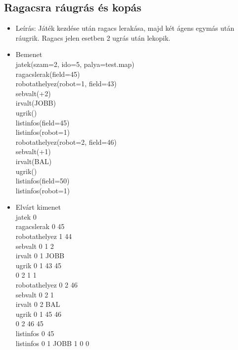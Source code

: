 \subsection{Ragacsra ráugrás és kopás}
\begin{itemize}
	\item Leírás: Játék kezdése után ragacs lerakása, majd két ágens egymás után ráugrik. Ragacs jelen esetben 2 ugrás után lekopik.
	\item Bemenet\\
		jatek(szam=2, ido=5, palya=test.map) \\
		ragacslerak(field=45) \\
		robotathelyez(robot=1, field=43) \\
		sebvalt(+2) \\
		irvalt(JOBB) \\
		ugrik() \\
		listinfos(field=45) \\
		listinfos(robot=1) \\
		robotathelyez(robot=2, field=46) \\
		sebvalt(+1) \\
		irvalt(BAL) \\
		ugrik() \\
		listinfos(field=50) \\		
		listinfos(robot=1) \\		
	\item Elvárt kimenet\\
		jatek 0 \\
		ragacslerak 0 45 \\
		robotathelyez 1 44 \\
		sebvalt 0 1 2 \\ 
		irvalt 0 1 JOBB \\  
		ugrik 0 1 43 45 \\ 
			  0 2 1 1 \\ 		
		robotathelyez 0 2 46 \\
		sebvalt 0 2 1 \\ 
		irvalt 0 2 BAL \\  
		ugrik 0 1 45 46 \\ 
		      0 2 46 45 \\ 		
		listinfos 0 45 \\
		listinfos 0 1 JOBB 1 0 0 \\
\end{itemize}

